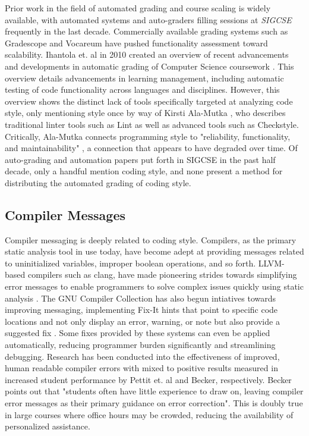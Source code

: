 \documentclass[sigconf]{acmart}
\begin{document}
Prior work in the field of automated grading and course scaling is widely available,
with automated systems and auto-graders filling sessions at \textit{SIGCSE} frequently
in the last decade. Commercially available grading systems such as Gradescope
and Vocareum have pushed functionality assessment toward scalability. Ihantola et.
al in 2010 created an overview of recent advancements and developments in automatic
grading of Computer Science coursework \cite{10.1145/1930565.1930480}. This overview
details advancements in learning management, including automatic testing of code
functionality across languages and disciplines. However, this overview shows the
distinct lack of tools specifically targeted at analyzing code style, only mentioning
style once by way of Kirsti Ala-Mutka \cite{doi:10.1080/08993400500150747}, who describes
traditional linter tools such as Lint as well as advanced tools such as Checkstyle.
Critically, Ala-Mutka connects programming style to "reliability, functionality, and
maintainability" \cite{doi:10.1080/08993400500150747}, a connection that appears to have
degraded over time. Of auto-grading and automation papers put forth in SIGCSE in the past
half decade, only a handful mention coding style, and none present a method for
distributing the automated grading of coding style.
\\

\subsection{Compiler Messages}

Compiler messaging is deeply related to coding style. Compilers, as the primary static
analysis tool in use today, have become adept at providing messages related to
uninitialized variables, improper boolean operations, and so forth. LLVM-based compilers
such as clang, have made pioneering strides towards simplifying error messages to enable
programmers to solve complex issues quickly using static analysis
\cite{ClangStaticChecks}. The GNU Compiler Collection has also begun intiatives towards
improving messaging, implementing Fix-It hints that point to specific code locations and
not only display an error, warning, or note but also provide a suggested fix
\cite{GCCFixItHints}. Some fixes provided by these systems can even be applied
automatically, reducing programmer burden significantly and streamlining debugging.
Research has been conducted into the effectiveness of improved, human readable compiler
errors with mixed \cite{10.1145/3017680.3017768} to positive results
\cite{10.1145/2839509.2844584} measured in increased student performance by Pettit et. al
and Becker, respectively. Becker points out that "students often have little experience
to draw on, leaving compiler error messages as their primary guidance on error
correction". This is doubly true in large courses where office hours may be crowded,
reducing the availability of personalized assistance.
\\
\end{document}
